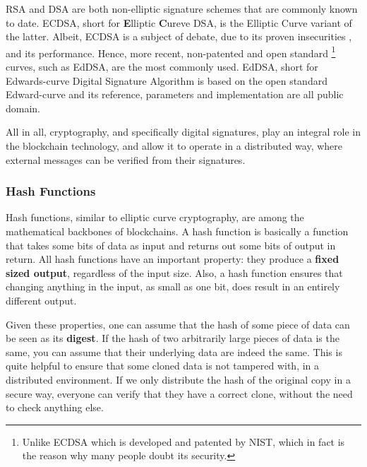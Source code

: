 RSA and DSA are both non-elliptic signature schemes that are commonly known to date. ECDSA, short
for \textbf{E}lliptic \textbf{C}ureve DSA, is the Elliptic Curve variant of the latter. Albeit,
ECDSA is a subject of debate, due to its proven insecurities
\cite{Brumley_Tuveri_2011_remote_timing_ecdsa}, and its performance. Hence, more recent,
non-patented and open standard \footnote{Unlike ECDSA which is developed and patented by NIST, which
in fact is the reason why many people doubt its security.} curves, such as EdDSA, are the most
commonly used. EdDSA, short for Edwards-curve Digital Signature Algorithm is based on the open
standard Edward-curve and its reference, parameters and implementation are all public domain.

All in all, cryptography, and specifically digital signatures, play an integral role in the blockchain
technology, and allow it to operate in a distributed way, where external messages can be verified from their signatures.

\subsubsection{Hash Functions} \label{chap_bg:subsec:hash}

Hash functions, similar to elliptic curve cryptography, are among the mathematical backbones of
blockchains. A hash function is basically a function that takes some bits of data as input and returns
out some bits of output in return. All hash functions have an important property: they produce
a \textbf{fixed sized output}, regardless of the input size. Also, a hash function ensures that
changing anything in the input, as small as one bit, does result in an entirely different output.

Given these properties, one can assume that the hash of some piece of data can be seen as its \textbf{digest}.
If the hash of two arbitrarily large pieces of data is the same, you can assume that their
underlying data are indeed the same. This is quite helpful to ensure that some cloned data is not
tampered with, in a distributed environment. If we only distribute the hash of the original copy in a secure way, everyone can verify
that they have a correct clone, without the need to check anything else.

